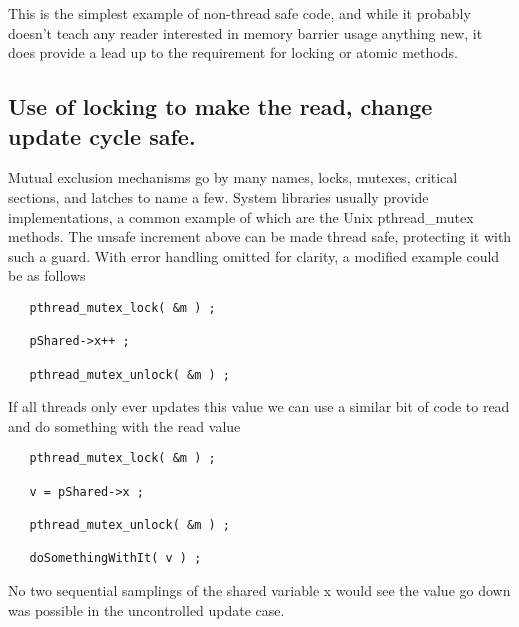 This is the simplest example of non-thread safe code, and while it probably doesn't teach any reader interested in memory barrier usage anything new, it does provide a lead up to the requirement for locking or atomic methods.

\subsection{Use of locking to make the read, change update cycle safe.}

Mutual exclusion mechanisms go by many names, locks, mutexes, critical sections, and latches to name a few.  System libraries usually provide implementations, a common example of which are the Unix pthread\_mutex methods.  The unsafe increment above can be made thread safe, protecting it with such a guard.  With error handling omitted for clarity, a modified example could be as follows

\begin{lstlisting}
   pthread_mutex_lock( &m ) ;

   pShared->x++ ;

   pthread_mutex_unlock( &m ) ;
\end{lstlisting}

If all threads only ever updates this value we can use a similar bit of code to read and do something with the read value

\begin{lstlisting}
   pthread_mutex_lock( &m ) ;

   v = pShared->x ;

   pthread_mutex_unlock( &m ) ;

   doSomethingWithIt( v ) ;
\end{lstlisting}

No two sequential samplings of the shared variable x would see the value go down was possible in the uncontrolled update case.  

